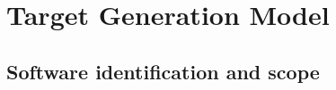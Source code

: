 %
%

\section{Target Generation Model}
\label{app:target-generator}

\subsection{Software identification and scope}

